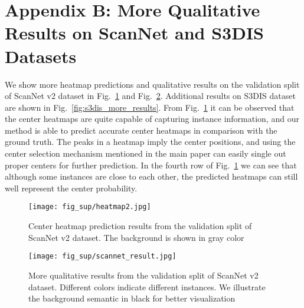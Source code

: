\documentclass[runningheads]{llncs}
\begin{document}
\section*{Appendix B: More Qualitative Results on ScanNet and S3DIS Datasets}
We show more heatmap predictions and qualitative results on the validation split of ScanNet v2 dataset in Fig.~\ref{fig:scannet_more_results} and Fig.~\ref{fig:scannet_more_results_2}. Additional results on S3DIS dataset are shown in Fig.~\ref{fig:s3dis_more_results}.
From Fig.~\ref{fig:scannet_more_results} it can be observed that the center heatmaps are quite capable of capturing instance information, and our method is able to predict accurate center heatmaps in comparison with the ground truth. The peaks in a heatmap imply the center positions, and using the center selection mechanism mentioned in the main paper can easily single out proper centers for further prediction. In the fourth row of Fig.~\ref{fig:scannet_more_results} we can see that although some instances are close to each other, the predicted heatmaps can still well represent the center probability. 
\begin{comment}
In the cases of second and third rows in Figure \ref{fig:scannet_more_results_2}, with the help of center heatmap, GICN can predict correct instance masks even some instances (chairs) sit next to each other in the testing scene. 
\end{comment}

\begin{figure}[H]
\centering
\begin{center}
 \texttt{[image: fig\_sup/heatmap2.jpg]}
   \caption{Center heatmap prediction results from the validation split of ScanNet v2 dataset. The background is shown in gray color}
\label{fig:scannet_more_results}
\end{center}
\end{figure}


\begin{figure}[H]
\centering
\begin{center}
 \texttt{[image: fig\_sup/scannet\_result.jpg]}
   \caption{More qualitative results from the validation split of ScanNet v2 dataset. Different colors indicate different instances. We illustrate the background semantic in black for better visualization}
\label{fig:scannet_more_results_2}
\end{center}
\end{figure}
\end{document}
